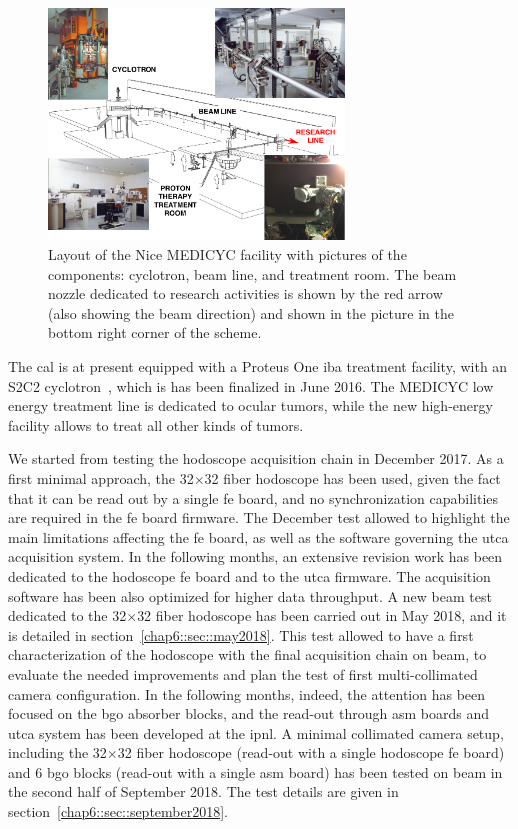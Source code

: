  \begin{figure}[!htbp]
\centering
\includegraphics[width=0.7\textwidth]{03_GraphicFiles/chapter6_BeamTests/MEDICYC_scheme.png}
\caption{Layout of the Nice MEDICYC facility with pictures of the components: cyclotron, beam line, and treatment room. The beam nozzle dedicated to research activities is shown by the red arrow (also showing the beam direction) and shown in the picture in the bottom right corner of the scheme.}
\label{chap6::fig::MEDICYC_layoutDetails}
\end{figure}

The \gls{cal} is at present equipped with a Proteus One \gls{iba} treatment facility, with an S2C2 cyclotron~\parencite{Pearson2013}, which is has been finalized in June 2016. The MEDICYC low energy treatment line is dedicated to ocular tumors, while the new high-energy facility allows to treat all other kinds of tumors.

We started from testing the hodoscope acquisition chain in December 2017. As a first minimal approach, the 32$\times$32 fiber hodoscope has been used, given the fact that it can be read out by a single \gls{fe} board, and no synchronization capabilities are required in the \gls{fe} board firmware. The December test allowed to highlight the main limitations affecting the \gls{fe} board, as well as the software governing the \gls{utca} acquisition system.
In the following months, an extensive revision work has been dedicated to the hodoscope \gls{fe} board and to the \gls{utca} firmware. The acquisition software has been also optimized for higher data throughput.  
A new beam test dedicated to the 32$\times$32 fiber hodoscope has been carried out in May 2018, and it is detailed in section~\ref{chap6::sec::may2018}. This test allowed to have a first characterization of the hodoscope with the final acquisition chain on beam, to evaluate the needed improvements and plan the test of first multi-collimated camera configuration. In the following months, indeed, the attention has been focused on the \gls{bgo} absorber blocks, and the read-out through \gls{asm} boards and  \gls{utca} system has been developed at the \gls{ipnl}. A minimal collimated camera setup, including the 32$\times$32 fiber hodoscope (read-out with a single hodoscope \gls{fe} board) and 6 \gls{bgo} blocks (read-out with a single \gls{asm} board) has been tested on beam in the second half of September 2018. The test details are given in section~\ref{chap6::sec::september2018}. 
 
